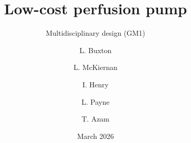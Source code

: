 \documentclass{beamer}
\title{Low-cost perfusion pump}
\subtitle{Multidisciplinary design (GM1)}
\author{L. Buxton \and L. McKiernan \and I. Henry \and L. Payne \and T. Azam}
\institute{University of Cambridge}
\date{March 2026}
\begin{document}
\frame{\titlepage}
\end{document}
